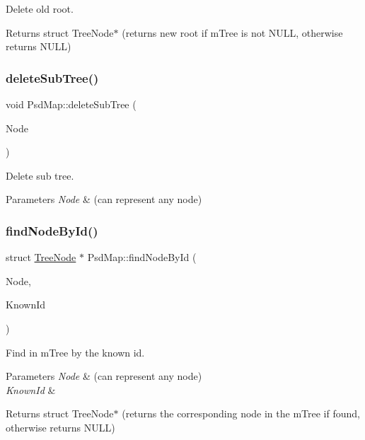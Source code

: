 Delete old root. 

\begin{DoxyReturn}{Returns}
struct Tree\+Node$\ast$ (returns new root if m\+Tree is not N\+U\+LL, otherwise returns N\+U\+LL) 
\end{DoxyReturn}
\mbox{\label{class_psd_map_a2309336d5a1a083f2d715a9dc520575d}} 
\subsubsection{\texorpdfstring{delete\+Sub\+Tree()}{deleteSubTree()}}
{\footnotesize\ttfamily void Psd\+Map\+::delete\+Sub\+Tree (\begin{DoxyParamCaption}\item[{struct \hyperlink{struct_tree_node}{Tree\+Node} $\ast$}]{Node }\end{DoxyParamCaption})}



Delete sub tree. 


\begin{DoxyParams}{Parameters}
{\em Node} & (can represent any node) \\
\hline
\end{DoxyParams}
\mbox{\label{class_psd_map_aec8b191b16852e62c4234dfba7885aa0}} 
\subsubsection{\texorpdfstring{find\+Node\+By\+Id()}{findNodeById()}}
{\footnotesize\ttfamily struct \hyperlink{struct_tree_node}{Tree\+Node} $\ast$ Psd\+Map\+::find\+Node\+By\+Id (\begin{DoxyParamCaption}\item[{struct \hyperlink{struct_tree_node}{Tree\+Node} $\ast$}]{Node,  }\item[{uint8\+\_\+t}]{Known\+Id }\end{DoxyParamCaption})}



Find in m\+Tree by the known id. 


\begin{DoxyParams}{Parameters}
{\em Node} & (can represent any node) \\
\hline
{\em Known\+Id} & \\
\hline
\end{DoxyParams}
\begin{DoxyReturn}{Returns}
struct Tree\+Node$\ast$ (returns the corresponding node in the m\+Tree if found, otherwise returns N\+U\+LL) 
\end{DoxyReturn}
\mbox{\label{class_psd_map_a559bfdc80678bf39ebcf0d351d002838}} 
